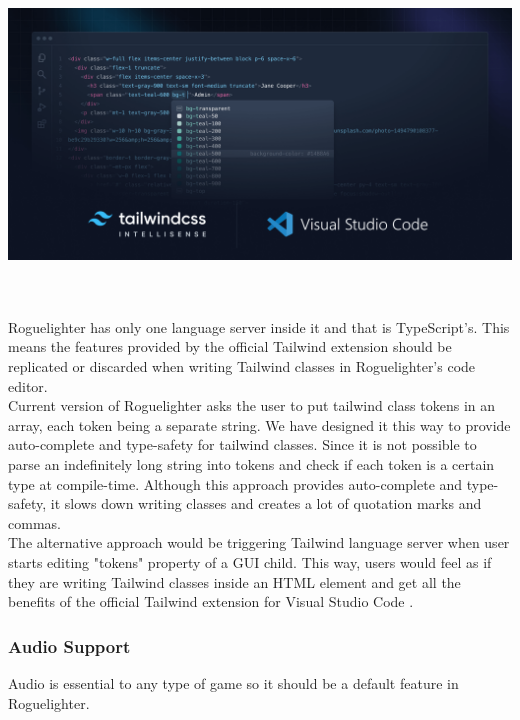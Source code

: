 \documentclass{article}
\begin{document}
\begin{minipage}{\linewidth}
    \centering
    \includegraphics[width=1\textwidth]{tailwind-autocomplete.png}
\end{minipage}\\\\

Roguelighter has only one language server inside it and that is TypeScript's. This means the features provided by the official Tailwind extension should be replicated or discarded when writing Tailwind classes in Roguelighter's code editor.\\

Current version of Roguelighter asks the user to put tailwind class tokens in an array, each token being a separate string. We have designed it this way to provide auto-complete and type-safety for tailwind classes. Since it is not possible to parse an indefinitely long string into tokens and check if each token is a certain type at compile-time. Although this approach provides auto-complete and type-safety, it slows down writing classes and creates a lot of quotation marks and commas.\\

The alternative approach would be triggering Tailwind language server when user starts editing "tokens" property of a GUI child. This way, users would feel as if they are writing Tailwind classes inside an HTML element and get all the benefits of the official Tailwind extension for Visual Studio Code \cite{tailwind-vscode}. 
\subsubsection{Audio Support}
Audio is essential to any type of game so it should be a default feature in Roguelighter.
\clearpage
\printbibliography
\clearpage
\listoffigures
\end{document}
